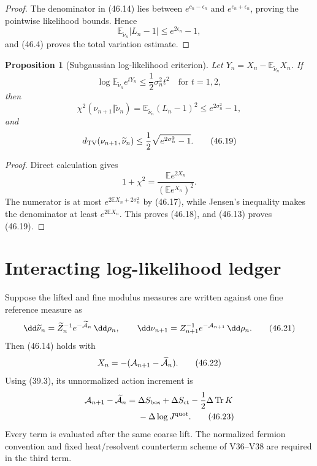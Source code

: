 \documentclass[11pt]{article}
\newtheorem{proposition}[theorem]{Proposition}
\theoremstyle{remark}
\begin{document}
\begin{proof}
The denominator in (46.14) lies between
\(e^{c_n-\epsilon_n}\) and \(e^{c_n+\epsilon_n}\), proving the
pointwise likelihood bounds.  Hence
\[
 \mathbb E_{\widetilde\nu_n}|L_n-1|
 \leq e^{2\epsilon_n}-1,
\]
and (46.4) proves the total variation estimate.
\end{proof}

\begin{proposition}[Subgaussian log-likelihood criterion]
\label{prop:v15v46-subgaussian}
Let \(Y_n=X_n-\mathbb E_{\widetilde\nu_n}X_n\).  If
\[
 \log\mathbb E_{\widetilde\nu_n}e^{tY_n}
 \leq\frac12\sigma_n^2t^2
 \quad\text{for }t=1,2,                                 \tag{46.17}
\]
then
\[
 \chi^2(\nu_{n+1}\Vert\widetilde\nu_n)
 =\mathbb E_{\widetilde\nu_n}(L_n-1)^2
 \leq e^{2\sigma_n^2}-1,                                \tag{46.18}
\]
and
\[
 d_{\rm TV}(\nu_{n+1},\widetilde\nu_n)
 \leq\frac12\sqrt{e^{2\sigma_n^2}-1}.                   \tag{46.19}
\]
\end{proposition}

\begin{proof}
Direct calculation gives
\[
 1+\chi^2
 =\frac{\mathbb E e^{2X_n}}
        {(\mathbb E e^{X_n})^2}.                         \tag{46.20}
\]
The numerator is at most
\(e^{2\mathbb EX_n+2\sigma_n^2}\) by (46.17), while Jensen's
inequality makes the denominator at least
\(e^{2\mathbb EX_n}\).  This proves (46.18), and (46.13) proves
(46.19).
\end{proof}

\section{Interacting log-likelihood ledger}

Suppose the lifted and fine modulus measures are written against one
fine reference measure as
\[
 \dd\widetilde\nu_n=
 \widetilde Z_n^{-1}e^{-\widetilde{\cal A}_n}\,\dd\rho_n,
 \qquad
 \dd\nu_{n+1}=
 Z_{n+1}^{-1}e^{-{\cal A}_{n+1}}\,\dd\rho_n.             \tag{46.21}
\]
Then (46.14) holds with
\[
 X_n=-( {\cal A}_{n+1}-\widetilde{\cal A}_n).            \tag{46.22}
\]
Using (39.3), its unnormalized action increment is
\[
 \begin{split}
 {\cal A}_{n+1}-\widetilde{\cal A}_n
={}&\Delta S_{\rm bos}+\Delta S_{\rm ct}
 -\frac12\Delta\operatorname{Tr}K\\
 &-\Delta\log J^{\rm quot}.                             \tag{46.23}
 \end{split}
\]
Every term is evaluated after the same coarse lift.  The normalized
fermion convention and fixed heat/resolvent counterterm scheme of
V36--V38 are required in the third term.
\end{document}
